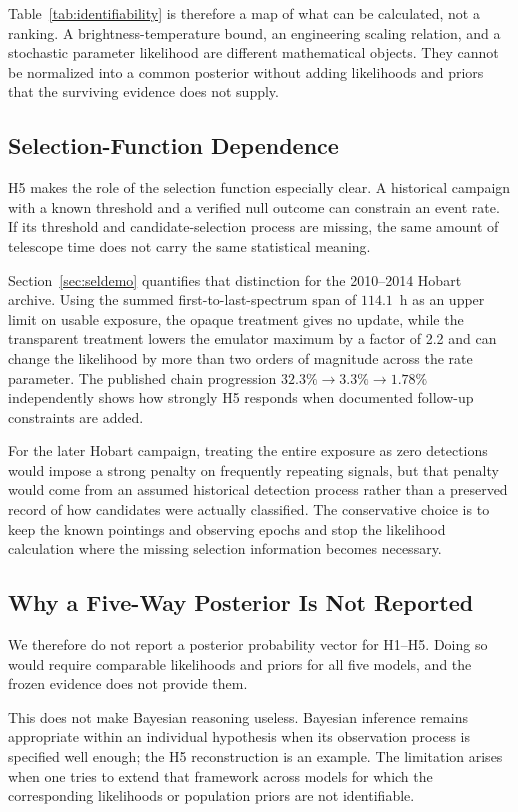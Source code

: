 \documentclass[crop]{CSL}
\begin{document}
Table~\ref{tab:identifiability} is therefore a map of what can be calculated, not a ranking. A brightness-temperature bound, an engineering scaling relation, and a stochastic parameter likelihood are different mathematical objects. They cannot be normalized into a common posterior without adding likelihoods and priors that the surviving evidence does not supply.

\subsection{Selection-Function Dependence}

H5 makes the role of the selection function especially clear. A historical campaign with a known threshold and a verified null outcome can constrain an event rate. If its threshold and candidate-selection process are missing, the same amount of telescope time does not carry the same statistical meaning.

Section~\ref{sec:seldemo} quantifies that distinction for the 2010--2014 Hobart archive. Using the summed first-to-last-spectrum span of $114.1$~h as an upper limit on usable exposure, the opaque treatment gives no update, while the transparent treatment lowers the emulator maximum by a factor of 2.2 and can change the likelihood by more than two orders of magnitude across the rate parameter. The published chain progression $32.3\%\rightarrow3.3\%\rightarrow1.78\%$ independently shows how strongly H5 responds when documented follow-up constraints are added.

For the later Hobart campaign, treating the entire exposure as zero detections would impose a strong penalty on frequently repeating signals, but that penalty would come from an assumed historical detection process rather than a preserved record of how candidates were actually classified. The conservative choice is to keep the known pointings and observing epochs and stop the likelihood calculation where the missing selection information becomes necessary.

\subsection{Why a Five-Way Posterior Is Not Reported}

We therefore do not report a posterior probability vector for H1--H5. Doing so would require comparable likelihoods and priors for all five models, and the frozen evidence does not provide them.

This does not make Bayesian reasoning useless. Bayesian inference remains appropriate within an individual hypothesis when its observation process is specified well enough; the H5 reconstruction is an example. The limitation arises when one tries to extend that framework across models for which the corresponding likelihoods or population priors are not identifiable.
\end{document}
